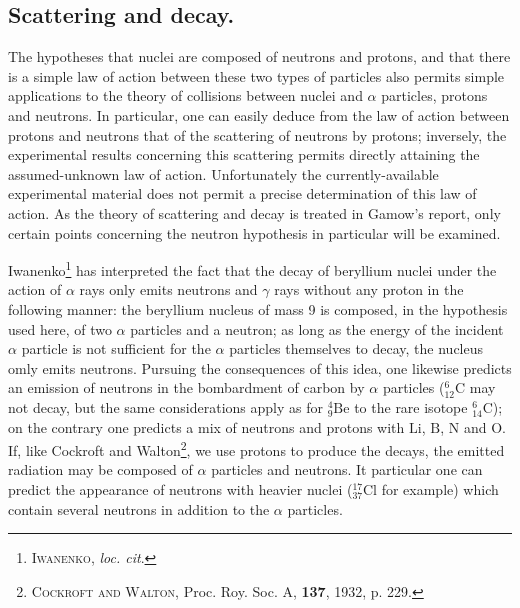 \documentclass[a4paper,11pt]{article}
\newcommand{\?}[2]{#1\footnote{\textsc{Translator note}: #2}}
\newcommand{\citeauthor}[1]{\textsc{#1}}
\newcommand{\citepub}[1]{#1}
\newcommand{\citevol}[1]{\textbf{#1}}
\newcommand{\citepage}[1]{#1}
\newcommand{\citeyear}[1]{#1}
\newcommand{\El}[1]{\text{#1}}
\newcommand{\mnEl}[3]{{}^{#1}_{#2}{\El{#3}}}
\begin{document}
{{\subsection{Scattering and decay.}

The hypotheses that nuclei are composed of neutrons and protons, and that there is a simple law of action between these two types of particles also permits simple applications to the theory of collisions between nuclei and $\alpha$ particles, protons and neutrons. In particular, one can easily deduce from the law of action between protons and neutrons that of the scattering of neutrons by protons; inversely, the experimental results concerning this scattering permits directly attaining the assumed-unknown law of action. Unfortunately the currently-available experimental material does not permit a precise determination of this law of action. As the theory of scattering and decay is treated in Gamow's report, only certain points concerning the neutron hypothesis in particular will be examined.

Iwanenko\footnote{\citeauthor{Iwanenko}, \textit{loc. cit}.} has interpreted the fact that the decay of beryllium nuclei under the action of $\alpha$ rays only emits neutrons and $\gamma$ rays without any proton in the following manner: the beryllium nucleus of mass 9 is composed, in the hypothesis used here, of two $\alpha$ particles and a neutron; as long as the energy of the incident $\alpha$ particle is not sufficient for the $\alpha$ particles themselves to decay, the nucleus omly emits neutrons. Pursuing the consequences of this idea, one likewise predicts an emission of neutrons in the bombardment of carbon by $\alpha$ particles ($\mnEl{6}{12}{C}$ may not decay, but the same considerations apply as for $\mnEl{4}{9}{Be}$ to the rare isotope $\mnEl{6}{14}{C}$); on the contrary one predicts a mix of neutrons and protons with $\El{Li}$, $\El{B}$, $\El{N}$ and $\El{O}$. If, like Cockroft and Walton\footnote{\citeauthor{Cockroft and Walton}, \citepub{Proc. Roy. Soc. A}, \citevol{137}, \citeyear{1932}, \citepage{p. 229}.}, we use protons to produce the decays, the emitted radiation may be composed of $\alpha$ particles and neutrons. It particular one can predict the appearance of neutrons with heavier nuclei ($\mnEl{17}{37}{Cl}$ for example) which contain several neutrons in addition to the $\alpha$ particles.

}}
\end{document}
